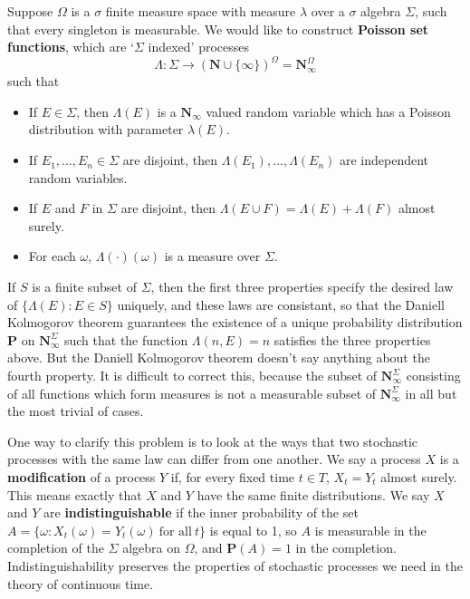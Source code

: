\begin{example}
    Suppose $\Omega$ is a $\sigma$ finite measure space with measure $\lambda$ over a $\sigma$ algebra $\Sigma$, such that every singleton is measurable. We would like to construct {\bf Poisson set functions}, which are `$\Sigma$ indexed' processes
    \[ \Lambda: \Sigma \to (\mathbf{N} \cup \{ \infty \})^\Omega = \mathbf{N}_\infty^\Omega \]
    such that
    \begin{itemize}
        \item If $E \in \Sigma$, then $\Lambda(E)$ is a $\mathbf{N}_\infty$ valued random variable which has a Poisson distribution with parameter $\lambda(E)$.
        \item If $E_1, \dots, E_n \in \Sigma$ are disjoint, then $\Lambda(E_1), \dots, \Lambda(E_n)$ are independent random variables.
        \item If $E$ and $F$ in $\Sigma$ are disjoint, then $\Lambda(E \cup F) = \Lambda(E) + \Lambda(F)$ almost surely.
        \item For each $\omega$, $\Lambda(\cdot)(\omega)$ is a measure over $\Sigma$.
    \end{itemize}
    If $S$ is a finite subset of $\Sigma$, then the first three properties specify the desired law of $\{ \Lambda(E) : E \in S \}$ uniquely, and these laws are consistant, so that the Daniell Kolmogorov theorem guarantees the existence of a unique probability distribution $\mathbf{P}$ on $\mathbf{N}_\infty^\Sigma$ such that the function $\Lambda(n,E) = n$ satisfies the three properties above. But the Daniell Kolmogorov theorem doesn't say anything about the fourth property. It is difficult to correct this, because the subset of $\mathbf{N}_\infty^\Sigma$ consisting of all functions which form measures is not a measurable subset of $\mathbf{N}_\infty^\Sigma$ in all but the most trivial of cases.
\end{example}

One way to clarify this problem is to look at the ways that two stochastic processes with the same law can differ from one another. We say a process $X$ is a {\bf modification} of a process $Y$ if, for every fixed time $t \in T$, $X_t = Y_t$ almost surely. This means exactly that $X$ and $Y$ have the same finite distributions. We say $X$ and $Y$ are {\bf indistinguishable} if the inner probability of the set $A = \{ \omega: X_t(\omega) = Y_t(\omega)\ \text{for all}\ t \}$ is equal to 1, so $A$ is measurable in the completion of the $\Sigma$ algebra on $\Omega$, and $\mathbf{P}(A) = 1$ in the completion. Indistinguishability preserves the properties of stochastic processes we need in the theory of continuous time.

